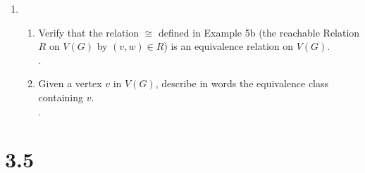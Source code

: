 \documentclass[11pt]{article}
\begin{document}
\begin{enumerate}
\begin{enumerate}
	.
	\end{enumerate}
\setcounter{enumi}{16}
\item 
	\begin{enumerate}
	\item Verify that the relation $\cong$ defined in Example 5b (the reachable Relation $R$ on $V(G)$ by $(v,w)\in R$) is an 
	equivalence relation on $V(G)$.\\
	.
	\item Given a vertex $v$ in $V(G)$, describe in words the equivalence class containing $v$.\\
	.
	\end{enumerate}
\end{enumerate}

\section*{3.5}
\end{document}
